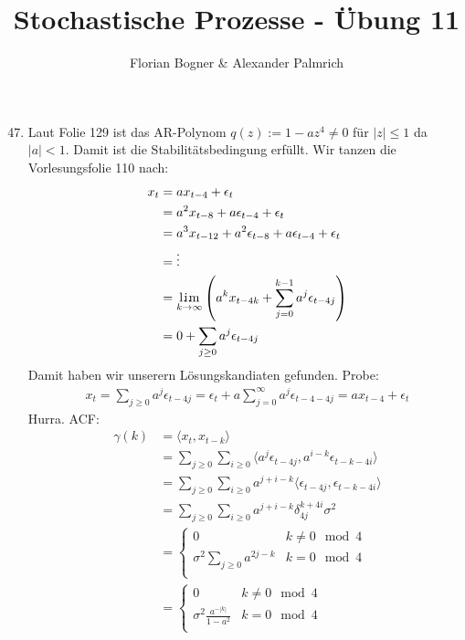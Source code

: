 \documentclass[a4paper,11pt,notitlepage,fullpage]{article}
\DeclareMathOperator*{\limm}{l.\hspace{-0.18em}i.\hspace{-0.19em}m}
\begin{document}
\author{Florian Bogner \& Alexander Palmrich}
\title{Stochastische Prozesse - Übung 11}
\maketitle

\begin{enumerate}
\setcounter{enumi}{46}


\item Laut Folie 129 ist das AR-Polynom $q(z) := 1 - a z^4 \neq 0$ für $|z| \leq 1$ da $|a| < 1$. Damit ist die Stabilitätsbedingung erfüllt. Wir tanzen die Vorlesungsfolie 110 nach: 
\begin{align*}
x_t &= a x_{t-4} + \epsilon_t \\
&= a^2 x_{t-8} + a \epsilon_{t-4} + \epsilon_t \\
&= a^3 x_{t-12}+ a^2 \epsilon_{t-8} + a \epsilon_{t-4} + \epsilon_t \\
&= \vdots \\
&= \limm_{k \to \infty}\left( a^k x_{t-4k} + \sum_{j=0}^{k-1}a^j \epsilon_{t-4j} \right) \\
&= 0 + \sum_{j\geq0} a^j \epsilon_{t-4j}
\end{align*}
Damit haben wir unserern Lösungskandiaten gefunden. Probe:
\begin{align*}
x_t = \sum_{j\geq0} a^j \epsilon_{t-4j} = \epsilon_t + a\sum_{j=0}^{\infty} a^j \epsilon_{t-4-4j} = a x_{t-4} + \epsilon_t
\end{align*}
Hurra. ACF:
\begin{align*}
\gamma(k) &= \langle x_t, x_{t-k} \rangle \\
&= \sum_{j\geq0} \sum_{i\geq0} \langle a^j \epsilon_{t - 4j}, a^{i-k} \epsilon_{t - k - 4i}\rangle \\
&= \sum_{j\geq0} \sum_{i\geq0} a^{j+i-k} \langle \epsilon_{t - 4j}, \epsilon_{t - k - 4i}\rangle \\
&= \sum_{j\geq0} \sum_{i\geq0} a^{j+i-k} \delta_{4j}^{k+4i} \sigma^2 \\
&= \begin{cases}
0 & k \neq 0 \mod 4 \\
\sigma^2 \sum_{j\geq0} a^{2j-k} & k = 0 \mod 4 \\
\end{cases} \\
&= \begin{cases}
0 & k \neq 0 \mod 4 \\
\sigma^2 \frac{a^{-|k|}}{1 - a^2} & k = 0 \mod 4 \\
\end{cases} \\
\end{align*}


\end{enumerate}
\end{document}
